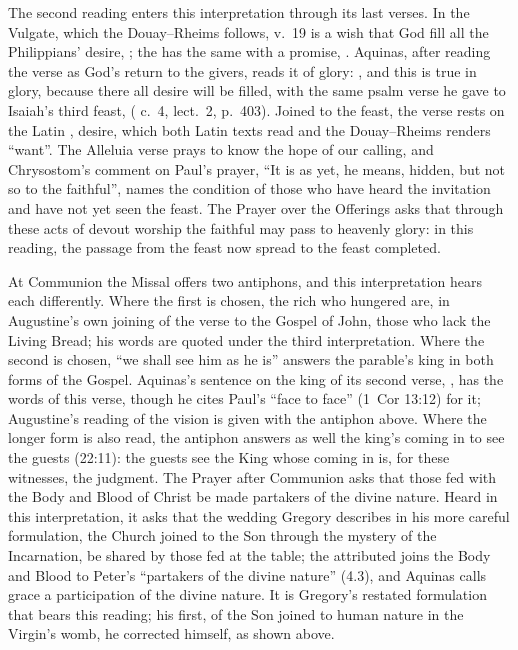 The second reading enters this interpretation through its last verses. In
the Vulgate, which the Douay--Rheims follows, v.~19 is a wish that God fill all
the Philippians' desire, ; the  has the same  with a promise, .
Aquinas, after reading the verse as God's return to the givers, reads it of
glory: , and this is true in glory, because there all
desire will be filled, with the same psalm verse he gave to Isaiah's third
feast,  (
c.~4, lect.~2, p.~403). Joined to the feast, the verse rests on the Latin
, desire, which both Latin texts read and the Douay--Rheims
renders ``want''. The Alleluia verse prays to know the hope of our calling,
and Chrysostom's comment on Paul's prayer, ``It is as yet, he means, hidden,
but not so to the faithful'', names the condition of those who have heard the
invitation and have not yet seen the feast. The Prayer over the Offerings asks
that through these acts of devout worship the faithful may pass to heavenly
glory: in this reading, the passage from the feast now spread to the feast
completed.

At Communion the Missal offers two antiphons, and this interpretation hears
each differently. Where the first is chosen, the rich who hungered are,
in Augustine's own joining of the verse to the Gospel of John, those who lack
the Living Bread; his words are quoted under the third interpretation. Where the second is chosen, ``we shall see him as he is''
answers the parable's king in both forms of the Gospel. Aquinas's sentence on
the king of its second verse, ,
has the words of this verse, though he cites Paul's ``face to face''
(1~Cor 13:12) for it; Augustine's reading of the vision is given with the
antiphon above. Where the longer form is also
read, the antiphon answers as well the king's coming in to see the guests
(22:11): the guests see the King whose coming in is, for these witnesses, the
judgment. The Prayer after Communion asks that those fed with the
Body and Blood of Christ be made partakers of the divine nature. Heard in this
interpretation, it asks that the wedding Gregory describes in his more careful
formulation, the Church joined to the Son through the mystery of the
Incarnation, be shared by those fed at the table; the attributed
 joins the Body and Blood to Peter's ``partakers of the divine
nature'' (4.3), and Aquinas calls grace a participation of the divine nature.
It is Gregory's restated formulation that bears this reading; his first, of
the Son joined to human nature in the Virgin's womb, he corrected himself, as
shown above.

